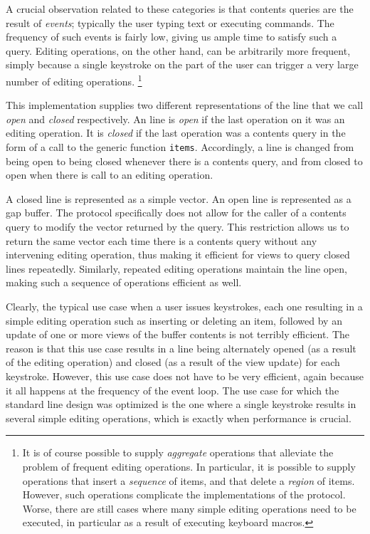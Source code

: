 A crucial observation related to these categories is that contents
queries are the result of \emph{events}; typically the user typing
text or executing commands.  The frequency of such events is fairly
low, giving us ample time to satisfy such a query.  Editing
operations, on the other hand, can be arbitrarily more frequent,
simply because a single keystroke on the part of the user can trigger
a very large number of editing operations.%
\footnote{It is of course possible to supply \emph{aggregate}
  operations that alleviate the problem of frequent editing
  operations.  In particular, it is possible to supply operations that
  insert a \emph{sequence} of items, and that delete a \emph{region}
  of items.  However, such operations complicate the implementations
  of the protocol.  Worse, there are still cases where many simple
  editing operations need to be executed, in particular as a result of
  executing keyboard macros.}

This implementation supplies two different representations of the line
that we call \emph{open} and \emph{closed} respectively.  An line is
\emph{open} if the last operation on it was an editing operation.  It
is \emph{closed} if the last operation was a contents query in the
form of a call to the generic function \texttt{items}.  Accordingly, a
line is changed from being open to being closed whenever there is a
contents query, and from closed to open when there is call to an
editing operation.

A closed line is represented as a \commonlisp{} simple vector.  An
open line is represented as a gap buffer. 
The protocol specifically does not allow for the caller of a contents
query to modify the vector returned by the query.  This restriction
allows us to return the same vector each time there is a contents
query without any intervening editing operation, thus making it
efficient for views to query closed lines repeatedly.  Similarly,
repeated editing operations maintain the line open, making such a
sequence of operations efficient as well.

Clearly, the typical use case when a user issues keystrokes, each one
resulting in a simple editing operation such as inserting or deleting
an item, followed by an update of one or more views of the buffer
contents is not terribly efficient.  The reason is that this use case
results in a line being alternately opened (as a result of the editing
operation) and closed (as a result of the view update) for each
keystroke.  However, this use case does not have to be very efficient,
again because it all happens at the frequency of the event loop.  The
use case for which the standard line design was optimized is the one
where a single keystroke results in several simple editing operations,
which is exactly when performance is crucial.

